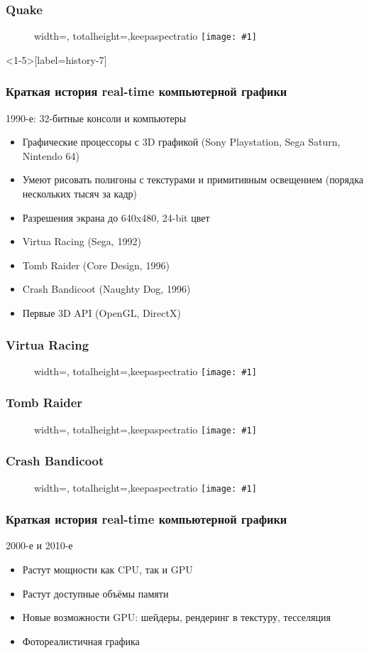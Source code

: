 \documentclass{beamer}
\newcommand{\slideimage}[1]{
  \begin{figure}
    \begin{adjustbox}{width=\textwidth, totalheight=\textheight-2\baselineskip-2\baselineskip,keepaspectratio}
      \texttt{[image: \#1]}
    \end{adjustbox}
  \end{figure}
}
\begin{document}
\begin{frame}
\frametitle{Quake}
\slideimage{quake.png}
\end{frame}

\begin{frame}<1-5>[label=history-7]
\frametitle{Краткая история real-time компьютерной графики}
\centerline{1990-е: 32-битные консоли и компьютеры}
\pause
\begin{itemize}
\item Графические процессоры с 3D графикой (Sony Playstation, Sega Saturn, Nintendo 64)
\pause
\item Умеют рисовать полигоны с текстурами и примитивным освещением (порядка нескольких тысяч за кадр)
\pause
\item Разрешения экрана до 640x480, 24-bit цвет
\pause
\item Virtua Racing (Sega, 1992)
\pause
\item Tomb Raider (Core Design, 1996)
\pause
\item Crash Bandicoot (Naughty Dog, 1996)
\pause
\item Первые 3D API (OpenGL, DirectX)
\end{itemize}
\end{frame}

\begin{frame}
\frametitle{Virtua Racing}
\slideimage{racing.png}
\end{frame}


\begin{frame}
\frametitle{Tomb Raider}
\slideimage{tomb-raider.png}
\end{frame}


\begin{frame}
\frametitle{Crash Bandicoot}
\slideimage{crash.jpg}
\end{frame}

\begin{frame}
\frametitle{Краткая история real-time компьютерной графики}
\centerline{2000-е и 2010-е}
\pause
\begin{itemize}
\item Растут мощности как CPU, так и GPU
\pause
\item Растут доступные объёмы памяти
\pause
\item Новые возможности GPU: шейдеры, рендеринг в текстуру, тесселяция
\pause
\item Фотореалистичная графика
\end{itemize}
\end{frame}
\end{document}
